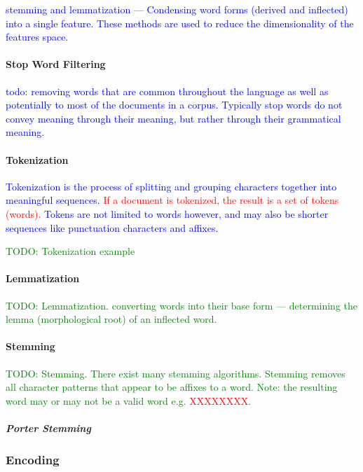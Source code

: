 \textcolor{blue}{stemming and lemmatization --- Condensing word forms (derived and inflected) into a single feature. These methods are used to reduce the dimensionality of the features space.}

\paragraph{Stop Word Filtering}

\textcolor{blue}{todo: removing words that are common throughout the language as well as potentially to most of the documents in a corpus. Typically stop words do not convey meaning through their meaning, but rather through their grammatical meaning.}

\paragraph{Tokenization}

\textcolor{blue}{Tokenization is the process of splitting and grouping characters together into meaningful sequences. \textcolor{red}{If a document is tokenized, the result is a set of tokens (words).} Tokens are not limited to words however, and may also be shorter sequences like punctuation characters and affixes.}

\textcolor{green}{TODO: Tokenization example}

\paragraph{Lemmatization}

\textcolor{green}{TODO: Lemmatization. converting words into their base form --- determining the lemma (morphological root) of an inflected word.}

\paragraph{Stemming}

\textcolor{green}{TODO: Stemming. There exist many stemming algorithms. Stemming removes all character patterns that appear to be affixes to a word. Note: the resulting word may or may not be a valid word e.g. \textcolor{red}{XXXXXXXX}.}

\subparagraph{Porter Stemming}

\subsubsection{Encoding}

